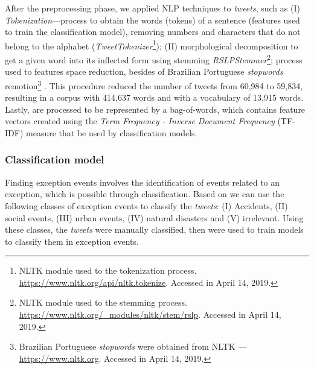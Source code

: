 \documentclass[runningheads]{llncs}
\begin{document}
After the preprocessing phase, we applied NLP techniques to \textit{tweets}, such as (I) \textit{Tokenization}---process to obtain the words (tokens) of a sentence (features used to train the classification model), removing numbers and characters that do not belong to the alphabet (\textit{TweetTokenizer}\footnote{NLTK module used to the tokenization process. \url{https://www.nltk.org/api/nltk.tokenize}. Accessed in April 14, 2019.}); (II) morphological decomposition to get a given word into its inflected form using stemming \textit{RSLPStemmer}\footnote{NLTK module used to the stemming process. \url{https://www.nltk.org/\_modules/nltk/stem/rslp}. Accessed in April 14, 2019.}; process used to features space reduction, besides of Brazilian Portuguese \textit{stopwords} remotion\footnote{Brazilian Portuguese \textit{stopwords} were obtained from NLTK --- \url{https://www.nltk.org}. Accessed in April 14, 2019.} \cite{Setiawan2017, nadkarni2011natural, Korenius, roy2017understanding, collobert2011natural}. This procedure reduced the number of tweets from 60,984 to 59,834, resulting in a corpus with 414,637 words and with a vocabulary of 13,915 words. Lastly,   are processed to be represented by a bag-of-words, which contains feature vectors created using the \textit{Term Frequency - Inverse Document Frequency} (TF-IDF) measure that be used by classification models.

\subsubsection{Classification model}
\label{featuresEng}




Finding exception events involves the identification of events related to an exception,  which is possible through classification. Based on \cite{Itoh2016, Chen2016, Lecue2014, Gal-Tzur2014} we can use the following classes of exception events to classify the \textit{tweets}: (I) Accidents, (II) social events, (III) urban events, (IV) natural disasters and (V) irrelevant. Using these classes, the \textit{tweets} were manually classified, then were used to train models to classify them in exception events.
\end{document}
